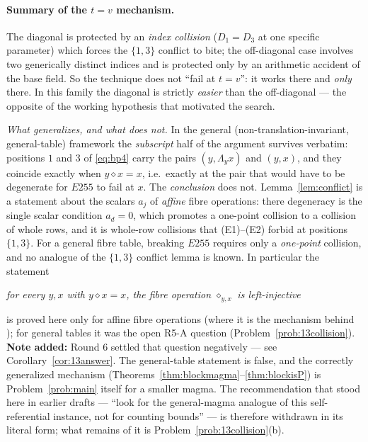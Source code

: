 \documentclass[11pt]{article}
\theoremstyle{plain}
\theoremstyle{definition}
\theoremstyle{remark}
\numberwithin{equation}{section}
\begin{document}
\paragraph{Summary of the $t=v$ mechanism.} The diagonal is protected by an \emph{index
collision} ($D_1 = D_3$ at one specific parameter) which forces the $\{1,3\}$ conflict to
bite; the off-diagonal case involves two generically distinct indices and is protected only by
an arithmetic accident of the base field. So the technique does not ``fail at $t=v$'': it
works there and \emph{only} there. In this family the diagonal is strictly \emph{easier} than
the off-diagonal --- the opposite of the working hypothesis that motivated the search.

\emph{What generalizes, and what does not.} In the general (non-translation-invariant,
general-table) framework the \emph{subscript} half of the argument survives verbatim:
positions $1$ and $3$ of \eqref{eq:bp4}
carry the pairs $(y,\Lambda_yx)$ and $(y,x)$, and they coincide exactly when $y\diamond x = x$,
i.e.\ exactly at the pair that would have to be degenerate for $E255$ to fail at $x$. The
\emph{conclusion} does not. Lemma~\ref{lem:conflict} is a statement about the scalars $a_j$
of \emph{affine} fibre operations: there degeneracy is the single scalar condition $a_d=0$,
which promotes a one-point collision to a collision of whole rows, and it is whole-row
collisions that (E1)--(E2) forbid at positions $\{1,3\}$. For a general fibre table, breaking
$E255$ requires only a \emph{one-point} collision, and no analogue of the $\{1,3\}$ conflict
lemma is known. In particular the statement
\begin{center}
\emph{for every $y,x$ with $y\diamond x = x$, the fibre operation $\diamond_{y,x}$ is
left-injective}
\end{center}
is proved here only for affine fibre operations (where it is the mechanism behind
\cite[Lemma~13.4]{blueprint}); for general tables it was the open R5-A question
(Problem~\ref{prob:13collision}). \textbf{Note added:} Round 6 settled that question
negatively --- see Corollary~\ref{cor:13answer}. The general-table statement is false, and
the correctly generalized mechanism (Theorems~\ref{thm:blockmagma}--\ref{thm:blockisP}) is
Problem~\ref{prob:main} itself for a smaller magma. The recommendation that stood here in
earlier drafts --- ``look for the general-magma analogue of this self-referential instance,
not for counting bounds'' --- is therefore withdrawn in its literal form; what remains of it
is Problem~\ref{prob:13collision}(b).
\end{document}
